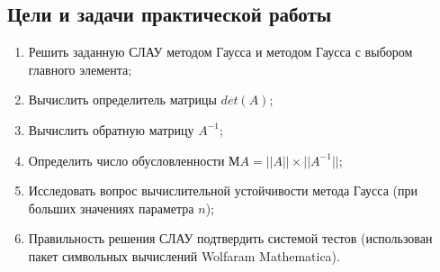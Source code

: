 \documentclass[a4paper,12pt,titlepage,finall]{article}
\begin{document}
\subsection{Цели и задачи практической работы}

\begin{enumerate}
\item
Решить заданную СЛАУ методом Гаусса и методом Гаусса с выбором главного
элемента;
\item
Вычислить определитель матрицы $det(A)$;
\item
Вычислить обратную матрицу $A^{-1}$;
\item
Определить число обусловленности $МA=||A|| \times ||A^{-1}||$;
\item
Исследовать вопрос вычислительной устойчивости метода Гаусса (при больших
значениях параметра $n$);
\item
Правильность решения СЛАУ подтвердить системой тестов (использован пакет символьных вычислений Wolfaram Mathematica).
\end{enumerate}

\newpage
\end{document}
